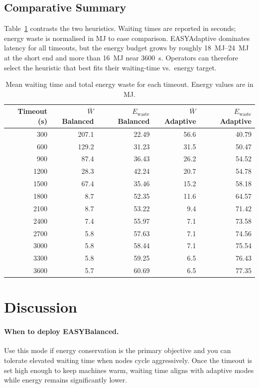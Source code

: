 \documentclass[11pt]{article}
\begin{document}
\subsection{Comparative Summary}
Table~\ref{tab:comparison} contrasts the two heuristics. Waiting times are reported in seconds; energy waste is normalised in \si{\mega\joule} to ease comparison. EASYAdaptive dominates latency for all timeouts, but the energy budget grows by roughly \SIrange{18}{24}{\mega\joule} at the short end and more than \SI{16}{\mega\joule} near \SI{3600}{\second}. Operators can therefore select the heuristic that best fits their waiting-time vs.\ energy target.

\begin{table}[h]
  \centering
  \caption{Mean waiting time and total energy waste for each timeout. Energy values are in \si{\mega\joule}.}
  \label{tab:comparison}
  \begin{tabular}{@{}rrrrr@{}}
    \toprule
    Timeout (s) & $\bar{W}$ Balanced & $E_{\mathrm{waste}}$ Balanced & $\bar{W}$ Adaptive & $E_{\mathrm{waste}}$ Adaptive \\
    \midrule
    300 & 207.1 & 22.49 & 56.6 & 40.79 \\
    600 & 129.2 & 31.23 & 31.5 & 50.47 \\
    900 & 87.4 & 36.43 & 26.2 & 54.52 \\
    1200 & 28.3 & 42.24 & 20.7 & 54.78 \\
    1500 & 67.4 & 35.46 & 15.2 & 58.18 \\
    1800 & 8.7 & 52.35 & 11.6 & 64.57 \\
    2100 & 8.7 & 53.22 & 9.4 & 71.42 \\
    2400 & 7.4 & 55.97 & 7.1 & 73.58 \\
    2700 & 5.8 & 57.63 & 7.1 & 74.56 \\
    3000 & 5.8 & 58.44 & 7.1 & 75.54 \\
    3300 & 5.8 & 59.25 & 6.5 & 76.43 \\
    3600 & 5.7 & 60.69 & 6.5 & 77.35 \\
    \bottomrule
  \end{tabular}
\end{table}

\section{Discussion}
\paragraph{When to deploy EASYBalanced.} Use this mode if energy conservation is the primary objective and you can tolerate elevated waiting time when nodes cycle aggressively. Once the timeout is set high enough to keep machines warm, waiting time aligns with adaptive modes while energy remains significantly lower.
\end{document}

